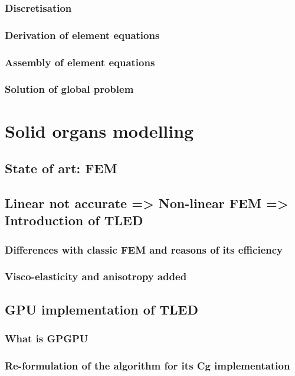 		\section{Discretisation}
		\section{Derivation of element equations}
		\section{Assembly of element equations}
		\section{Solution of global problem}



\part{Solid organs modelling}

	\chapter{State of art: FEM}

	\chapter{Linear not accurate => Non-linear FEM => Introduction of TLED}
		\section{Differences with classic FEM and reasons of its efficiency}
		\section{Visco-elasticity and anisotropy added }

	\chapter{GPU implementation of TLED}
		\section{What is GPGPU}
		\section{Re-formulation of the algorithm for its Cg implementation}

